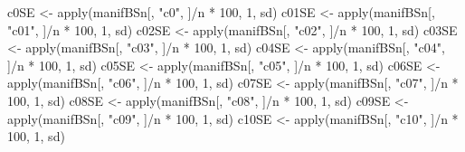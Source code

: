 \documentclass[
]{article}
\newenvironment{Shaded}{\begin{snugshade}}{\end{snugshade}}
\newcommand{\DecValTok}[1]{\textcolor[rgb]{0.00,0.00,0.81}{#1}}
\newcommand{\FunctionTok}[1]{\textcolor[rgb]{0.00,0.00,0.00}{#1}}
\newcommand{\NormalTok}[1]{#1}
\newcommand{\OtherTok}[1]{\textcolor[rgb]{0.56,0.35,0.01}{#1}}
\newcommand{\SpecialCharTok}[1]{\textcolor[rgb]{0.00,0.00,0.00}{#1}}
\newcommand{\StringTok}[1]{\textcolor[rgb]{0.31,0.60,0.02}{#1}}
\begin{document}
\begin{Shaded}
\begin{Highlighting}[]
\NormalTok{c0SE }\OtherTok{\textless{}{-}} \FunctionTok{apply}\NormalTok{(manifBSn[, }\StringTok{"c0"}\NormalTok{, ]}\SpecialCharTok{/}\NormalTok{n }\SpecialCharTok{*} \DecValTok{100}\NormalTok{, }\DecValTok{1}\NormalTok{, sd)}
\NormalTok{c01SE }\OtherTok{\textless{}{-}} \FunctionTok{apply}\NormalTok{(manifBSn[, }\StringTok{"c01"}\NormalTok{, ]}\SpecialCharTok{/}\NormalTok{n }\SpecialCharTok{*} \DecValTok{100}\NormalTok{, }\DecValTok{1}\NormalTok{, sd)}
\NormalTok{c02SE }\OtherTok{\textless{}{-}} \FunctionTok{apply}\NormalTok{(manifBSn[, }\StringTok{"c02"}\NormalTok{, ]}\SpecialCharTok{/}\NormalTok{n }\SpecialCharTok{*} \DecValTok{100}\NormalTok{, }\DecValTok{1}\NormalTok{, sd)}
\NormalTok{c03SE }\OtherTok{\textless{}{-}} \FunctionTok{apply}\NormalTok{(manifBSn[, }\StringTok{"c03"}\NormalTok{, ]}\SpecialCharTok{/}\NormalTok{n }\SpecialCharTok{*} \DecValTok{100}\NormalTok{, }\DecValTok{1}\NormalTok{, sd)}
\NormalTok{c04SE }\OtherTok{\textless{}{-}} \FunctionTok{apply}\NormalTok{(manifBSn[, }\StringTok{"c04"}\NormalTok{, ]}\SpecialCharTok{/}\NormalTok{n }\SpecialCharTok{*} \DecValTok{100}\NormalTok{, }\DecValTok{1}\NormalTok{, sd)}
\NormalTok{c05SE }\OtherTok{\textless{}{-}} \FunctionTok{apply}\NormalTok{(manifBSn[, }\StringTok{"c05"}\NormalTok{, ]}\SpecialCharTok{/}\NormalTok{n }\SpecialCharTok{*} \DecValTok{100}\NormalTok{, }\DecValTok{1}\NormalTok{, sd)}
\NormalTok{c06SE }\OtherTok{\textless{}{-}} \FunctionTok{apply}\NormalTok{(manifBSn[, }\StringTok{"c06"}\NormalTok{, ]}\SpecialCharTok{/}\NormalTok{n }\SpecialCharTok{*} \DecValTok{100}\NormalTok{, }\DecValTok{1}\NormalTok{, sd)}
\NormalTok{c07SE }\OtherTok{\textless{}{-}} \FunctionTok{apply}\NormalTok{(manifBSn[, }\StringTok{"c07"}\NormalTok{, ]}\SpecialCharTok{/}\NormalTok{n }\SpecialCharTok{*} \DecValTok{100}\NormalTok{, }\DecValTok{1}\NormalTok{, sd)}
\NormalTok{c08SE }\OtherTok{\textless{}{-}} \FunctionTok{apply}\NormalTok{(manifBSn[, }\StringTok{"c08"}\NormalTok{, ]}\SpecialCharTok{/}\NormalTok{n }\SpecialCharTok{*} \DecValTok{100}\NormalTok{, }\DecValTok{1}\NormalTok{, sd)}
\NormalTok{c09SE }\OtherTok{\textless{}{-}} \FunctionTok{apply}\NormalTok{(manifBSn[, }\StringTok{"c09"}\NormalTok{, ]}\SpecialCharTok{/}\NormalTok{n }\SpecialCharTok{*} \DecValTok{100}\NormalTok{, }\DecValTok{1}\NormalTok{, sd)}
\NormalTok{c10SE }\OtherTok{\textless{}{-}} \FunctionTok{apply}\NormalTok{(manifBSn[, }\StringTok{"c10"}\NormalTok{, ]}\SpecialCharTok{/}\NormalTok{n }\SpecialCharTok{*} \DecValTok{100}\NormalTok{, }\DecValTok{1}\NormalTok{, sd)}

\end{Highlighting}
\end{Shaded}
\end{document}
